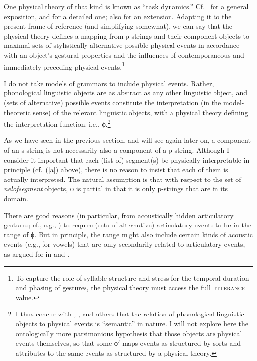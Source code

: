 \documentclass[output=paper]{langsci/langscibook}
\begin{document}
One 
physical theory of that kind is known as
``task dynamics.'' Cf.\ \cite{salt:95} for a general
exposition, and \cite{sal:mun:89} for a detailed one; also
\cite{mcg:sal:95} for an extension.  Adapting it to
the present frame of reference (and simplifying somewhat), we can say that
the physical theory defines a mapping from 
p-strings and their component objects to maximal sets of stylistically
alternative
possible physical events in accordance with an object's gestural
properties and the influences of contemporaneous and immediately preceding
physical events.\footnote{%
	To capture the role of syllable structure and
  stress for the temporal duration and phasing of gestures, the physical
  theory must access the full \textsc{utterance} value.%
}

I do not take models of grammars to include physical events. Rather,
phonological linguistic objects are as abstract as any other linguistic
object, and (sets of alternative) possible events constitute the
interpretation (in the model-theoretic sense) of the relevant linguistic
objects, with a physical theory defining the interpretation function, i.e.,
ϕ.\footnote{%
	I thus concur with \cite{sage:88},
  \cite{pier:90}, \cite{cole:98} and others that the relation of phonological linguistic objects
  to physical events is ``semantic'' in nature. I will not explore here the
  ontologically more parsimonious hypothesis that %
  those objects are physical events themselves, so that some ϕ$'$ maps events
  as structured by sorts and attributes to the same events as structured by
  a physical theory.%
}

As we have seen in the previous section, and will see again later on, a
component of an s-string is not necessarily also a component of a p-string.
Although I consider it important that each (list of) segment(s) be
physically interpretable in principle (cf.\ (\ref{a}) above), there is no
reason to insist that each of them is actually interpreted. The natural
assumption is that 
with respect to 
the set of \textit{nelofsegment}\/ objects, ϕ is
partial in that it is only p-strings that are in its domain.

There are good reasons (in particular, from acoustically hidden
articulatory gestures; cf., e.g.,
\citealt[363\hspace*{1pt}ff.\@]{bro:gol:90}) to require (sets of alternative) articulatory
events to be in the range of ϕ. But in principle, the range might also
include certain kinds of acoustic events (e.g., for vowels) that are only
secondarily related to articulatory events, as argued for
in \cite{lade:90} and
\cite{per:mat:svi:jor:95}.
\end{document}
